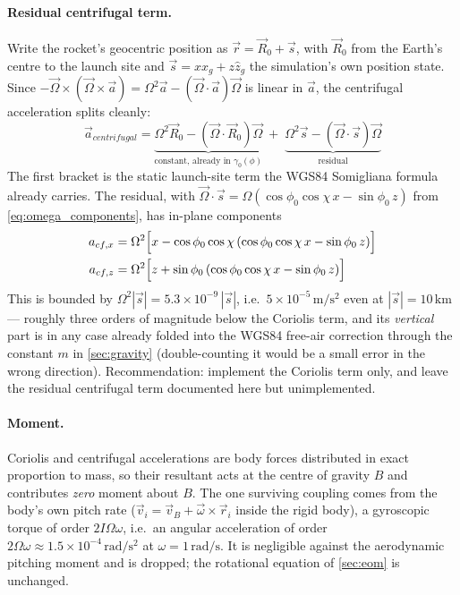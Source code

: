 {\paragraph{Residual centrifugal term.} Write the rocket's geocentric position as
$\vec{r} = \vec{R}_0 + \vec{s}$, with $\vec{R}_0$ from the Earth's centre to the launch site and
$\vec{s} = x\hat{x}_g + z\hat{z}_g$ the simulation's own position state. Since
$-\vec{\Omega}\times(\vec{\Omega}\times\vec{a}) = \Omega^2\vec{a} - (\vec{\Omega}\cdot\vec{a})
\vec{\Omega}$ is linear in $\vec{a}$, the centrifugal acceleration splits cleanly:
\begin{equation}
    \vec{a}_{centrifugal} = \underbrace{\Omega^2\vec{R}_0 - (\vec{\Omega}\cdot\vec{R}_0)\vec{\Omega}}_{\text{constant, already in }\gamma_0(\phi)}
    \;+\; \underbrace{\Omega^2\vec{s} - (\vec{\Omega}\cdot\vec{s})\vec{\Omega}}_{\text{residual}}
\end{equation}
The first bracket is the static launch-site term the WGS84 Somigliana formula already carries.
The residual, with $\vec{\Omega}\cdot\vec{s} = \Omega(\cos\phi_0\cos\chi\,x - \sin\phi_0\,z)$
from \autoref{eq:omega_components}, has in-plane components
\begin{align}
    a_{cf,x} &= \Omega^2\Bigl[x - \cos\phi_0\cos\chi\left(\cos\phi_0\cos\chi\,x - \sin\phi_0\,z\right)\Bigr] \\
    a_{cf,z} &= \Omega^2\Bigl[z + \sin\phi_0\left(\cos\phi_0\cos\chi\,x - \sin\phi_0\,z\right)\Bigr]
\end{align}
This is bounded by $\Omega^2|\vec{s}| = 5.3\times10^{-9}\,|\vec{s}|$, i.e.\
$5\times10^{-5}\,\mathrm{m/s^2}$ even at $|\vec{s}| = 10\,\mathrm{km}$ --- roughly three orders of
magnitude below the Coriolis term, and its \emph{vertical} part is in any case already folded into
the WGS84 free-air correction through the constant $m$ in \autoref{sec:gravity} (double-counting it would be
a small error in the wrong direction). Recommendation: implement the Coriolis term only, and leave
the residual centrifugal term documented here but unimplemented.

\paragraph{Moment.} Coriolis and centrifugal accelerations are body forces distributed in exact
proportion to mass, so their resultant acts at the centre of gravity $B$ and contributes
\emph{zero} moment about $B$. The one surviving coupling comes from the body's own pitch rate
($\vec{v}_i = \vec{v}_B + \vec{\omega}\times\vec{r}_i$ inside the rigid body), a gyroscopic torque
of order $2I\Omega\omega$, i.e.\ an angular acceleration of order
$2\Omega\omega \approx 1.5\times10^{-4}\,\mathrm{rad/s^2}$ at $\omega = 1\,\mathrm{rad/s}$. It is
negligible against the aerodynamic pitching moment and is dropped; the rotational equation of
\autoref{sec:eom} is unchanged.

}
